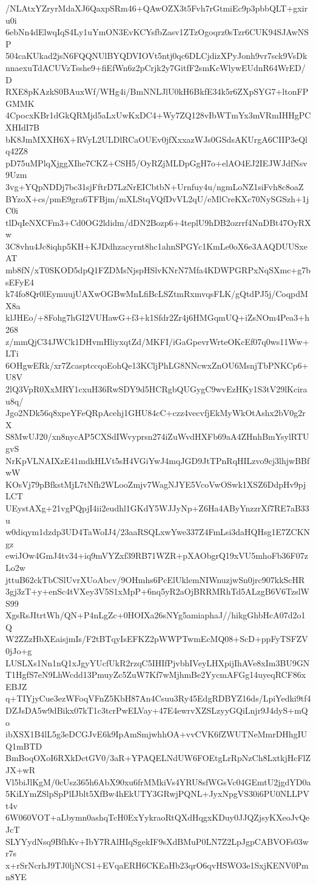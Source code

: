 /NLAtxYZryrMdaXJ6QaxpSRm46+QAwOZX3t5Fvh7rGtmiEc9p3pbbQLT+gxiru0i
6ebNn4dElwqIqS4Ly1uYmON3EvKCYsfbZasv1ZTzOgoqrz0sTzr6CUK94SJAwNSP
504caKUkad2jsN6FQQNUlBYQDVIOVt5ntj0qc6DLCjdizXPyJonh9vr7sck9VsDk
nnaexuTdACUVzTsshe9+fiEfWn6z2pCrjk2y7GitfF2smKcWlywEUdnR64WrED/D
RXE8pKAzkS0BAuxWf/WHg4i/BmNNLJlU0kH6BkfE34k5r6ZXpSYG7+ltonFPGMMK
4CpocxKBr1dGkQRMjd5aLxUwKxDC4+Wy7ZQ128vIbWTmYx3mVRmIHHgPCXHIdI7B
bK8JmMXXH6X+RVyL2ULDlRCaOUEv0jfXxxazWJs0GSdsAKUrgA6CIIP3eQlq42Z8
pD75uMPlqXjggXIhe7CKZ+CSH5/OyRZjMLDpGgH7o+elAO4EJ2IEJWJdfNsv9Uzm
3vg+YQpNDDj7bc31sjFftrD7LzNrEICbtbN+Urnfuy4u/ngmLoNZ1siFvh8c8oaZ
BYzoX+cs/pmE9gra6TFBjm/mXLStqVQfDvVL2qU/eMlCreKXc70NySGSzh+1jC0i
tlDqIeNXCFm3+Cd0OG2ldidm/dDN2Bozp6+4teplU9hDB2ozrrf4NnDBt47OyRXw
3C8vhu4Jc8iqhp5KH+KJDdhzacyrnt8hc1ahnSPGYc1KmLe0oX6e3AAQDUUSxeAT
mb8fN/xT0SKOD5dpQ1FZDMsNjspHSlvKNrN7Mfa4KDWPGRPxNqSXmc+g7bsEFyE4
k74fo8Qr0lEymuujUAXwOGBwMnLfiBcLSZtmRxmvqsFLK/gQtdPJ5j/CoqpdMX8a
klJHEo/+8Fohg7hGI2VUHawG+f3+k1Sfdr2Zr4j6HMGqmUQ+iZsNOm4Pea3+h268
z/mmQjC34JWCk1DHvmHliyxqtZd/MKFI/iGaGpevrWrteOKcEf07q0ws11Ww+LTi
6OHgwERk/xr7ZcasptccqoEohQe13KCljPhLG8NNcwxZnOU6MsnjTbPNKCp6+U8V
2lQ3VpR0XxMRY1cxuH36RwSDY9d5HCRgbQUGygC9wvEzHKy1S3tV29lKcirau8q/
Jgo2NDk56q8xpeYFeQRpAcehj1GHU84cC+czz4vecvfjEkMyWkOtAshx2bV0g2rX
S8MwUJ20/xn8nycAP5CXSdIWvyprsn274iZuWvdHXFb69aA4ZHnhBmYsylRTUgvS
NrKpVLNAIXzE41mdkHLVt5sH4VGiYwJ4mqJGD9JtTPnRqHILzvo9cj3lhjwBBfwW
KOsVj79pBfkstMjL7tNfh2WLooZmjv7WagNJYE5VcoVwOSwk1XSZ6DdpHv9pjLCT
UEystAXg+21vgPQpjI4ii2eudhl1GKdY5WJJyNp+Z6Ha4AByYnzzrXf7RE7aB33u
w0diqym1dzdp3UD4TaWoIJ4/23aaRSQLxwYwe337Z4FmLsi3daHQHsg1E7ZCKNgz
ewiJOw4GmJ4tv34+iq9mVYZxf39RB71WZR+pXAObgrQ19xVU5mhoFb36F07zLo2w
jttuB62ckTbCSlUvrXUoAbcv/9OHmhs6PcElUklemNIWnuzjwSn0jrc907kkScHR
3gj3zT+y+enSc4tVXey3V5S1xMpP+6nq5yR2aOjBRRMRhTd5ALzgB6V6TzslWS99
XgsRsJItrtWh/QN+P4nLgZc+0HOIXa26sNYg5amiaphaJ//hikgGhbHcA07d2o1Q
W2ZZzHbXEaisjmIs/F2tBTqyIsEFKZ2pWWPTwmEcMQ08+ScD+ppFyTSFZV0jJo+g
LUSLXs1Nn1nQ1xJgyYUcfUkR2rzqC5IHIfPjvbhIVeyLHXpijIhAVe8xIm3BU9GN
T1HgfS7eN9LhWcdd13PmuyZc5ZuW7Kf7wMjhmBe2YycmAFGg14uyeqRCF86xEBJZ
q+TIYjyCue3ezWFoqVFnZ5KbH87An4Csuu3Ry45EdgRDBYZ16ds/LpiYedki9tf4
DZJsDA5w9dBikx07kT1c3tcrPwELVay+47E4ewrvXZSLzyyGQiLnjr9J4dyS+mQo
ibXSX1B4lL5g3eDCGJvE6k9IpAmSmjwhhOA+vvCVK6fZWUTNeMmrDHhgIUQ1mBTD
BmBoqOXoI6RXkDctGV0/3aR+YPAQELNdUW6FOEtgLrRpNzCh8LxtkjHcFlZJX+wR
Vl5biJlKgM/0cUsz365h6AbX90xu6frMMkiVs4YRU8sfWGsVc04GEmtU2jgdYD0a
5KiLYmZSlpSpPlIJblt5XfBw4hEkUTY3GRwjPQNL+JyxNpgVS30i6PU0NLLPVt4v
6W060VOT+aLbymn0ashqTcH0ExYykraoRtQXdHqgxKDuy0JJQZjsyKXeoJvQeJcT
SLYYydNsq9BfhKv+IbY7RAlHIqSgekIF9sXdBMuP0LN7Z2LpJgpCABVOFs03wr7s
x+rSrNcrhJ9TJ0ljNCS1+EVqaERH6CKEaHb23qrO6qvHSWO3e1SxjKENV0Pmn8YE
